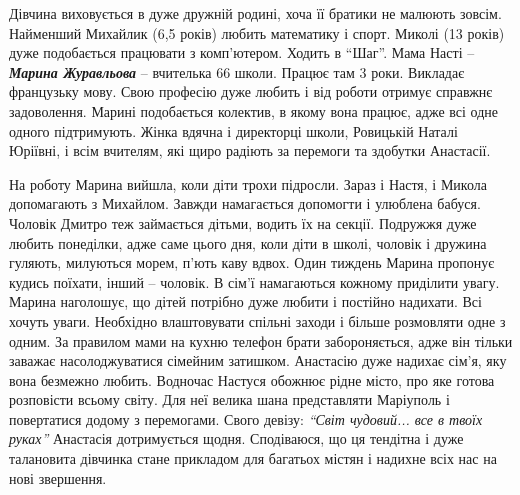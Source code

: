 Дівчина виховується в дуже дружній родині, хоча її братики не малюють зовсім.
Найменший Михайлик (6,5 років) любить математику і спорт. Миколі (13 років)
дуже подобається працювати з комп'ютером. Ходить в \enquote{Шаг}. Мама Насті – \emph{\textbf{Марина
Журавльова}} – вчителька 66 школи. Працює там 3 роки. Викладає французьку мову.
Свою професію дуже любить і від роботи отримує справжнє задоволення. Марині
подобається колектив, в якому вона працює, адже всі одне одного підтримують.
Жінка вдячна і директорці школи, Ровицькій Наталі Юріївні, і всім вчителям, які
щиро радіють за перемоги та здобутки Анастасії. 


На роботу Марина вийшла, коли діти трохи підросли. Зараз і Настя, і Микола
допомагають з Михайлом. Завжди намагається допомогти і улюблена бабуся. Чоловік
Дмитро теж займається дітьми, водить їх на секції. Подружжя дуже любить
понеділки, адже саме цього дня, коли діти в школі, чоловік і дружина гуляють,
милуються морем, п'ють каву вдвох.  Один тиждень Марина пропонує кудись
поїхати, інший – чоловік. В сім'ї намагаються кожному приділити увагу. Марина
наголошує, що дітей потрібно дуже любити і постійно надихати. Всі хочуть уваги.
Необхідно влаштовувати спільні заходи і більше розмовляти одне з одним. За
правилом мами на кухню телефон брати забороняється, адже він тільки заважає
насолоджуватися сімейним затишком.  Анастасію дуже надихає сім'я, яку вона
безмежно любить. Водночас Настуся обожнює рідне місто, про яке готова
розповісти всьому світу. Для неї велика шана представляти Маріуполь і
повертатися додому з перемогами. Свого девізу: \emph{\enquote{Світ чудовий...
все в твоїх руках}} Анастасія дотримується щодня.  Сподіваюся, що ця тендітна і
дуже талановита дівчинка стане прикладом для багатьох містян і надихне всіх нас
на нові звершення.

